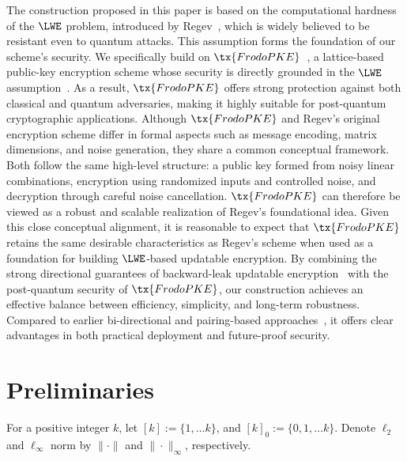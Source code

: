 \documentclass{fundam}
\begin{document}
The construction proposed in this paper is based on the computational hardness of the $\LWE$ problem, introduced by Regev~\cite{regev2009lattices}, which is widely believed to be resistant even to quantum attacks. This assumption forms the foundation of our scheme’s security. We specifically build on $\tx{FrodoPKE}$~\cite{Frodo,Frodo2}, a lattice-based public-key encryption scheme whose security is directly grounded in the $\LWE$ assumption~\cite{regev2009lattices}. As a result, $\tx{FrodoPKE}$ offers strong protection against both classical and quantum adversaries, making it highly suitable for post-quantum cryptographic applications. Although $\tx{FrodoPKE}$ and Regev’s original encryption scheme differ in formal aspects such as message encoding, matrix dimensions, and noise generation, they share a common conceptual framework. Both follow the same high-level structure: a public key formed from noisy linear combinations, encryption using randomized inputs and controlled noise, and decryption through careful noise cancellation. $\tx{FrodoPKE}$ can therefore be viewed as a robust and scalable realization of Regev’s foundational idea. Given this close conceptual alignment, it is reasonable to expect that $\tx{FrodoPKE}$ retains the same desirable characteristics as Regev’s scheme when used as a foundation for building $\LWE$-based updatable encryption. By combining the strong directional guarantees of backward-leak updatable encryption~\cite{nishimaki2022direction} with the post-quantum security of $\tx{FrodoPKE}$, our construction achieves an effective balance between efficiency, simplicity, and long-term robustness. Compared to earlier bi-directional and pairing-based approaches~\cite{LT18, BDGJ20}, it offers clear advantages in both practical deployment and future-proof security.

\section{Preliminaries}
For a positive integer $k$, let $[k]:=\{1,\ldots k\}$, and $[k]_{0}:=\{0,1,\ldots k\}$. Denote $\ell_{2}$ and $\ell_{\infty}$ norm by $\|\cdot\|$ and $\|\cdot\|_{\infty}$, respectively. 
\end{document}
